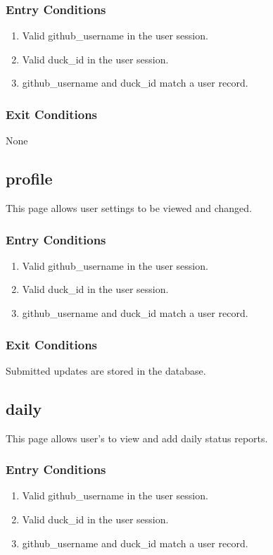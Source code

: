 \subsubsection*{Entry Conditions}
\begin{enumerate}
\item Valid github\_username in the user session.
\item Valid duck\_id in the user session.
\item github\_username and duck\_id match a user record.
\end{enumerate}

\subsubsection*{Exit Conditions}
None

\subsection*{profile}
This page allows user settings to be viewed and changed.

\subsubsection*{Entry Conditions}
\begin{enumerate}
\item Valid github\_username in the user session.
\item Valid duck\_id in the user session.
\item github\_username and duck\_id match a user record.
\end{enumerate}

\subsubsection*{Exit Conditions}
Submitted updates are stored in the database.


\subsection*{daily}
This page allows user's to view and add daily status reports.

\subsubsection*{Entry Conditions}
\begin{enumerate}
\item Valid github\_username in the user session.
\item Valid duck\_id in the user session.
\item github\_username and duck\_id match a user record.
\end{enumerate}

